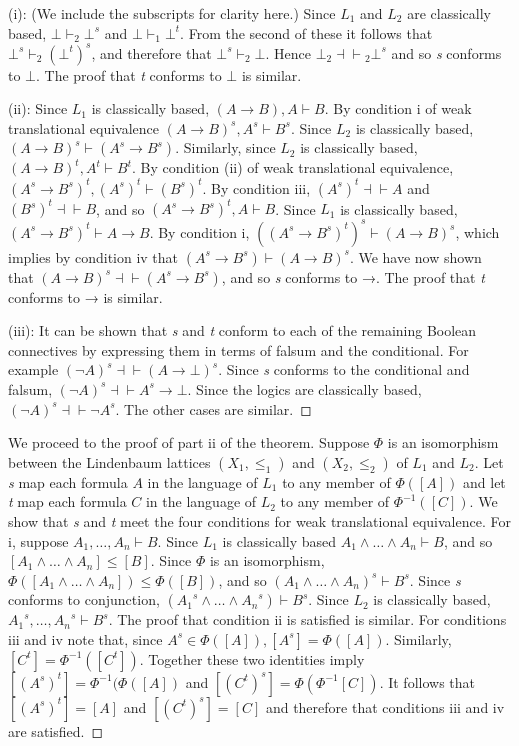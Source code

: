 \documentclass[
  11pt,
  letterpaper,
  DIV=11,
  numbers=noendperiod,
  twoside]{scrartcl}
\begin{document}
(i): (We include the subscripts for clarity here.) Since \(L_1\) and
\(L_2\) are classically based, \(\bot\vdash_2 \bot^s\) and
\(\bot \vdash_1 \bot^t\). From the second of these it follows that
\(\bot^s \vdash_2 (\bot^t)^s\), and therefore that
\(\bot^s \vdash_2 \bot\). Hence \(\bot_2\!{\dashv}{\vdash}\!_2 \bot^s\)
and so \emph{s} conforms to \(\bot\). The proof that \emph{t} conforms
to \(\bot\) is similar.

(ii): Since \(L_1\) is classically based,
\((A\rightarrow B),A \vdash B\). By condition i of weak translational
equivalence \((A\rightarrow B)^s, A^s \vdash B^s\). Since \(L_2\) is
classically based, \((A\rightarrow B)^s \vdash (A^s\rightarrow B^s)\).
Similarly, since \(L_2\) is classically based,
\((A\rightarrow B)^t,A^t \vdash B^t\). By condition (ii) of weak
translational equivalence,
\((A^s\rightarrow B^s)^t,(A^s)^t \vdash (B^s)^t\). By condition iii,
\((A^s)^t {\dashv}{\vdash}A\) and \((B^s)^t {\dashv}{\vdash}B\), and so
\((A^s\rightarrow B^s)^t,A \vdash B\). Since \(L_1\) is classically
based, \((A^s\rightarrow B^s)^t \vdash A\rightarrow B\). By condition i,
\(((A^s\rightarrow B^s)^t)^s \vdash (A\rightarrow B)^s\), which implies
by condition iv that \((A^s\rightarrow B^s) \vdash (A\rightarrow B)^s\).
We have now shown that
\((A\rightarrow B)^s{\dashv}{\vdash}(A^s\rightarrow B^s)\), and so
\emph{s} conforms to →. The proof that \emph{t} conforms to → is
similar.

(iii): It can be shown that \emph{s} and \emph{t} conform to each of the
remaining Boolean connectives by expressing them in terms of falsum and
the conditional. For example
\((\neg A)^s {\dashv}{\vdash} (A\rightarrow \bot)^s\). Since \emph{s}
conforms to the conditional and falsum,
\((\neg A)^s {\dashv}{\vdash} A^s \rightarrow \bot\). Since the logics
are classically based, \((\neg A)^s {\dashv}{\vdash} \neg A^s\). The
other cases are similar.~◻

We proceed to the proof of part ii of the theorem. Suppose \(\Phi\) is
an isomorphism between the Lindenbaum lattices \((X_1,\le _1)\) and
\((X_2,\le _2)\) of \(L_1\) and \(L_2\). Let \emph{s} map each formula
\(A\) in the language of \(L_1\) to any member of \(\Phi([A])\) and let
\emph{t} map each formula \(C\) in the language of \(L_2\) to any member
of \(\Phi^{-1}([C])\). We show that \emph{s} and \emph{t} meet the four
conditions for weak translational equivalence. For i, suppose
\(A_1,{\ldots},A_n \vdash B\). Since \(L_1\) is classically based
\(A_1\wedge {\ldots}\wedge A_n \vdash B\), and so
\([A_1\wedge {\ldots}\wedge A_n] \le [B]\). Since \(\Phi\) is an
isomorphism, \(\Phi([A_1\wedge {\ldots}\wedge A_n]) \le \Phi([B])\), and
so \((A_1\wedge {\ldots}\wedge A_n)^s \vdash B^s\). Since \emph{s}
conforms to conjunction,
\(({A_1}^s\wedge {\ldots}\wedge {A_n}^s) \vdash B^s\). Since \(L_2\) is
classically based, \({A_1}^s,{\ldots},{A_n}^s \vdash B^s\). The proof
that condition ii is satisfied is similar. For conditions iii and iv
note that, since \(A^s \in \Phi([A]), [A^s]= \Phi([A])\). Similarly,
\([C^t]= \Phi^{-1}([C^t])\). Together these two identities imply
\([(A^s)^t] = \Phi^{-1}(\Phi([A])\) and
\([(C^t)^s]= \Phi(\Phi^{-1}[C])\). It follows that \([(A^s)^t] = [A]\)
and \([(C^t)^s]=[C]\) and therefore that conditions iii and iv are
satisfied.~◻
\end{document}
